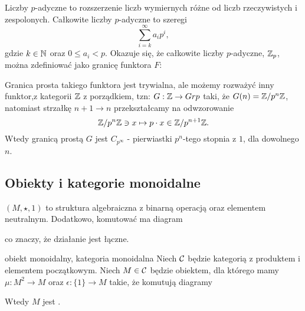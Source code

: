 {\begin{example}
  Liczby $p$-adyczne to rozszerzenie liczb wymiernych różne od liczb rzeczywistych i zespolonych. Całkowite liczby $p$-adyczne to szeregi
  $$\sum_{i=k}^\infty a_ip^i,$$
  gdzie $k\in\mathbb{N}$ oraz $0\leq a_i < p$. Okazuje się, że całkowite liczby $p$-adyczne, $\mathbb{Z}_p$, można zdefiniować jako granicę funktora $F$:
  \begin{center}
  \end{center}
  Granica prosta takiego funktora jest trywialna, ale możemy rozważyć inny funktor,z kategorii $\mathbb{Z}$ z porządkiem, tzn: $G:\mathbb{Z}\to Grp$ taki, że $G(n)=\mathbb{Z}/p^n\mathbb{Z}$, natomiast strzałkę $n+1\to n$ przekształcamy na odwzorowanie
  $$\mathbb{Z}/p^n\mathbb{Z}\ni x\mapsto p\cdot x\in \mathbb{Z}/p^{n+1}\mathbb{Z}.$$
  Wtedy granicą prostą $G$ jest $C_{p^\infty}$ - pierwiastki $p^n$-tego stopnia z $1$, dla dowolnego $n$. 
\end{example}

\subsection{Obiekty i kategorie monoidalne}

 $(M, \star, 1)$ to struktura algebraiczna z binarną operacją oraz elementem neutralnym. Dodatkowo, komutować ma diagram 
\begin{center}
\end{center}
co znaczy, że działanie jest łączne.

\begin{definition}{obiekt monoidalny, kategoria monoidalna}{}
  Niech $\mathcal{C}$ będzie kategorią z produktem i elementem początkowym. Niech $M\in \mathcal{C}$ będzie obiektem, dla którego mamy $\mu:M^2\to M$ oraz $\epsilon: \{1\}\to M$ takie, że komutują diagramy
  \begin{center}
  \end{center}
  \begin{center}
  \end{center}
  Wtedy $M$ jest .
  

\end{definition}}
